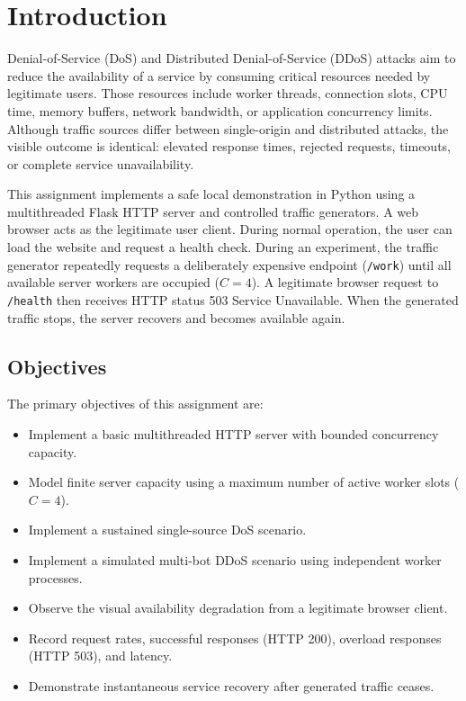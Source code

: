 \documentclass[11pt,a4paper]{article}
\begin{document}
\tableofcontents
\newpage

\section{Introduction}
Denial-of-Service (DoS) and Distributed Denial-of-Service (DDoS) attacks aim to reduce the availability of a service by consuming critical resources needed by legitimate users. Those resources include worker threads, connection slots, CPU time, memory buffers, network bandwidth, or application concurrency limits. Although traffic sources differ between single-origin and distributed attacks, the visible outcome is identical: elevated response times, rejected requests, timeouts, or complete service unavailability.

This assignment implements a safe local demonstration in Python using a multithreaded Flask HTTP server and controlled traffic generators. A web browser acts as the legitimate user client. During normal operation, the user can load the website and request a health check. During an experiment, the traffic generator repeatedly requests a deliberately expensive endpoint (\texttt{/work}) until all available server workers are occupied ($C = 4$). A legitimate browser request to \texttt{/health} then receives HTTP status 503 Service Unavailable. When the generated traffic stops, the server recovers and becomes available again.

\subsection{Objectives}
The primary objectives of this assignment are:
\begin{itemize}[leftmargin=*]
    \item Implement a basic multithreaded HTTP server with bounded concurrency capacity.
    \item Model finite server capacity using a maximum number of active worker slots ($C = 4$).
    \item Implement a sustained single-source DoS scenario.
    \item Implement a simulated multi-bot DDoS scenario using independent worker processes.
    \item Observe the visual availability degradation from a legitimate browser client.
    \item Record request rates, successful responses (HTTP 200), overload responses (HTTP 503), and latency.
    \item Demonstrate instantaneous service recovery after generated traffic ceases.
\end{itemize}
\end{document}
